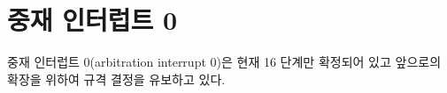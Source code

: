 \section{중재 인터럽트 0}
중재 인터럽트 0(arbitration interrupt 0)은 현재 16 단계만 확정되어 있고
앞으로의 확장을 위하여 규격 결정을 유보하고 있다.
